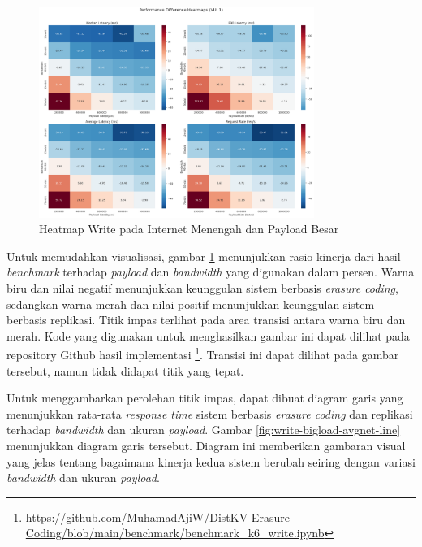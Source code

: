 \begin{enumerate}
  \begin{figure}[ht]
    \centering
    \includegraphics[width=0.8\textwidth]{resources/chapter-4/write_bigload_avgnet_heatmap.png}

    \caption{Heatmap Write pada Internet Menengah dan Payload Besar}
    \label{fig:write-bigload-avgnet-heatmap}
  \end{figure}

  Untuk memudahkan visualisasi, gambar \ref{fig:write-bigload-avgnet-heatmap} menunjukkan rasio kinerja dari hasil \textit{benchmark} terhadap \textit{payload} dan \textit{bandwidth} yang digunakan dalam persen. Warna biru dan nilai negatif menunjukkan keunggulan sistem berbasis \textit{erasure coding}, sedangkan warna merah dan nilai positif menunjukkan keunggulan sistem berbasis replikasi. Titik impas terlihat pada area transisi antara warna biru dan merah.  Kode yang digunakan untuk menghasilkan gambar ini dapat dilihat pada repository Github hasil implementasi \footnote{\url{https://github.com/MuhamadAjiW/DistKV-Erasure-Coding/blob/main/benchmark/benchmark_k6_write.ipynb}}. Transisi ini dapat dilihat pada gambar tersebut, namun tidak didapat titik yang tepat.

  Untuk menggambarkan perolehan titik impas, dapat dibuat diagram garis yang menunjukkan rata-rata \textit{response time} sistem berbasis \textit{erasure coding} dan replikasi terhadap \textit{bandwidth} dan ukuran \textit{payload}. Gambar \ref{fig:write-bigload-avgnet-line} menunjukkan diagram garis tersebut. Diagram ini memberikan gambaran visual yang jelas tentang bagaimana kinerja kedua sistem berubah seiring dengan variasi \textit{bandwidth} dan ukuran \textit{payload}.


\end{enumerate}
